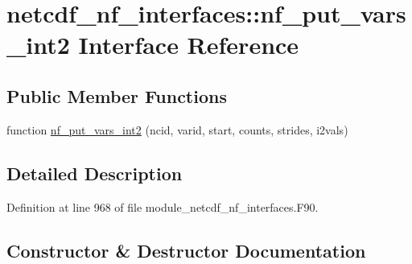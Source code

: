 \hypertarget{interfacenetcdf__nf__interfaces_1_1nf__put__vars__int2}{}\section{netcdf\+\_\+nf\+\_\+interfaces\+:\+:nf\+\_\+put\+\_\+vars\+\_\+int2 Interface Reference}
\label{interfacenetcdf__nf__interfaces_1_1nf__put__vars__int2}
\subsection*{Public Member Functions}
\begin{DoxyCompactItemize}
\item 
function \hyperlink{interfacenetcdf__nf__interfaces_1_1nf__put__vars__int2_a9ce38d015a3a909c4e92591a3d8b83f3}{nf\+\_\+put\+\_\+vars\+\_\+int2} (ncid, varid, start, counts, strides, i2vals)
\end{DoxyCompactItemize}


\subsection{Detailed Description}


Definition at line 968 of file module\+\_\+netcdf\+\_\+nf\+\_\+interfaces.\+F90.



\subsection{Constructor \& Destructor Documentation}
\mbox{\label{interfacenetcdf__nf__interfaces_1_1nf__put__vars__int2_a9ce38d015a3a909c4e92591a3d8b83f3}} 
